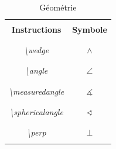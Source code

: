 \documentclass[a4paper, 10pt]{book}
\begin{document}
\begin{table}[t]
\caption{Géométrie} 
\textit{\\}
\centering
\begin{tabular}{|c|c|}
\hline \hline \\
\textbf{Instructions} & \textbf{Symbole} \\ \\
\hline \hline \\
\textit{\textbackslash wedge} & $ \wedge $ \\ \\
\hline \\
\textit{\textbackslash angle} & $ \angle $ \\ \\
\hline \\
\textit{\textbackslash measuredangle} & $ \measuredangle $ \\ \\
\hline \\
\textit{\textbackslash sphericalangle } & $ \sphericalangle $  \\ \\
\hline \\
\textit{\textbackslash perp} & $ \perp $ \\ \\
\hline
\end{tabular}
\end{table}

\textit{\\}
\pagebreak
\end{document}

